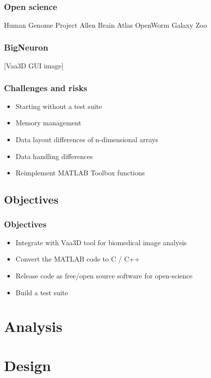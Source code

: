 \documentclass[%
        hyperref={%
                pdfauthor={Zakariyya Mughal},%
                pdfpagemode={None},pdfpagelayout={SinglePage}},%
        xcolor={x11names}%
]{beamer}
\begin{document}

\begin{frame}\frametitle{Open science}
	Human Genome Project
	Allen Brain Atlas
	OpenWorm
	Galaxy Zoo
\end{frame}


\begin{frame}\frametitle{BigNeuron}
	[Vaa3D GUI image]
\end{frame}

\begin{frame}[label=challenges]
\frametitle{Challenges and risks}
\begin{itemize}
	\item Starting without a test suite
	\item Memory management
	\item Data layout differences of n-dimensional arrays
	\item Data handling differences
	\item Reimplement MATLAB Toolbox functions
\end{itemize}
\end{frame}

\subsection{Objectives}
\begin{frame}
\frametitle{Objectives}
\begin{itemize}
	\item Integrate with Vaa3D tool for biomedical image analysis
	\item Convert the MATLAB code to C / C++
	\item Release code as free/open source software for open-science
	\item Build a test suite
\end{itemize}
\end{frame}

\section{Analysis}

\section{Design}
\end{document}
